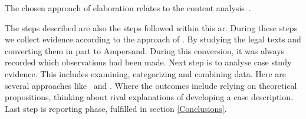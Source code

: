 The chosen approach of elaboration relates to the content analysis~\citep{kohlbacher_use_2006}.
\begin{comment}
Content analysis is a widely used research process.
It is a research method that converts qualitative data into quantitative figures.
This is done by reading and coding the qualitative data.
Qualitative data were obtained during the study in the form of notes and interviews.
Texts are assigned labels to show if there are important patterns in them.
Content analysis helps to see the amount of patterns in the data and to understand the connections between patterns.
The content analysis based on qualitative data as described by~\cite{kohlbacher_use_2006} is more often used in a case study.
\end{comment}
The steps described are also the steps followed within this \acrshort{ar}.
During these steps we collect evidence according to the approach of \cite{kohlbacher_use_2006} .
By studying the legal texts and converting them in part to Ampersand.
During this conversion, it was always recorded which observations had been made.
Next step is to analyse case study evidence.
This includes examining, categorizing and combining data.
Here are several approaches like~\cite{hsieh_three_2005} and \cite{mayring_qualitative_2019}.
Where the outcomes include relying on theoretical propositions, thinking about rival explanations of developing a case description.
Last step is reporting phase, fulfilled in section \ref{Conclusions}.


